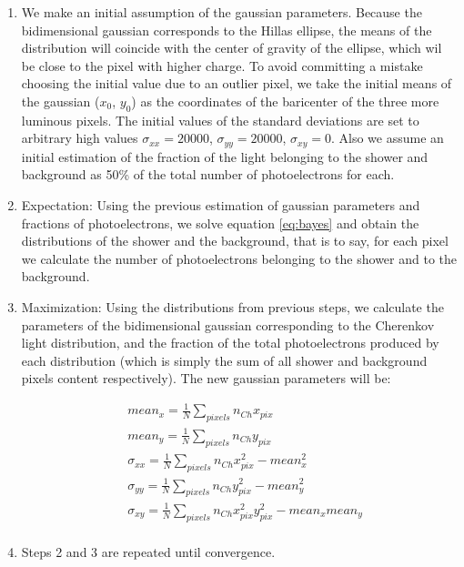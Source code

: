 \documentclass[main.tex]{subfiles}
\begin{document}
\begin{enumerate}
  \item We make an initial assumption of the gaussian parameters. Because the bidimensional gaussian corresponds to the Hillas ellipse, the means of the distribution will coincide with the center of gravity of the ellipse, which wil be close to the pixel with higher charge. To avoid committing a mistake choosing the initial value due to an outlier pixel, we take the initial means of the gaussian ($x_0$, $y_0$) as the coordinates of the baricenter of the three more luminous pixels. The initial values of the standard deviations are set to arbitrary high values $\sigma_{xx}=20000$, $\sigma_{yy}=20000$, $\sigma_{xy}=0$. Also we assume an initial estimation of the fraction of the light belonging to the shower and background as 50\% of the total number of photoelectrons for each.

  \item Expectation: Using the previous estimation of gaussian parameters and fractions of photoelectrons, we solve equation \ref{eq:bayes} and obtain the distributions of the shower and the background, that is to say, for each pixel we calculate the number of photoelectrons belonging to the shower and to the background.

  \item Maximization: Using the distributions from previous steps, we calculate the parameters of the bidimensional gaussian corresponding to the Cherenkov light distribution, and the fraction of the total photoelectrons produced by each distribution (which is simply the sum of all shower and background pixels content respectively). The new gaussian parameters will be:

    \begin{equation}
      \begin{split}
        & mean_{x} = \frac{1}{N}\sum_{pixels} n_{Ch} x_{pix}\\
        & mean_{y} = \frac{1}{N}\sum_{pixels} n_{Ch} y_{pix}\\
        & \sigma_{xx} = \frac{1}{N}\sum_{pixels} n_{Ch} x_{pix}^{2} - mean_{x}^2\\
        & \sigma_{yy} = \frac{1}{N}\sum_{pixels} n_{Ch} y_{pix}^{2} - mean_{y}^2\\
        & \sigma_{xy} = \frac{1}{N}\sum_{pixels} n_{Ch} x_{pix}^{2} y_{pix}^{2} - mean_{x}mean_{y}\\
      \end{split}
    \end{equation}
  
  \item Steps 2 and 3 are repeated until convergence.


\end{enumerate}
\end{document}
